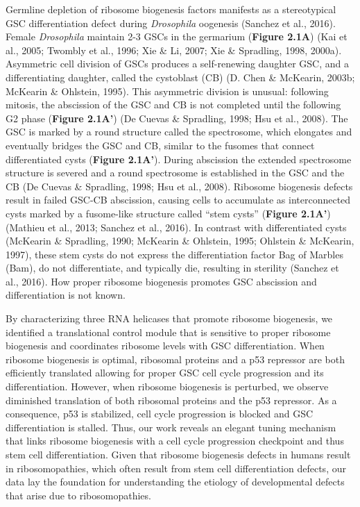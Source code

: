 \documentclass[12pt,oneside]{reedthesis}
\begin{document}
Germline depletion of ribosome biogenesis factors manifests as a
stereotypical GSC differentiation defect during \emph{Drosophila} oogenesis
(Sanchez et al., 2016). Female \emph{Drosophila} maintain 2-3 GSCs in the
germarium (\textbf{Figure 2.1A}) (Kai et al., 2005; Twombly et al., 1996; Xie \& Li, 2007; Xie \& Spradling, 1998, 2000a). Asymmetric cell division of GSCs produces a
self-renewing daughter GSC, and a differentiating daughter, called the
cystoblast (CB) (D. Chen \& McKearin, 2003b; McKearin \& Ohlstein, 1995). This asymmetric
division is unusual: following mitosis, the abscission of the GSC and CB
is not completed until the following G2 phase (\textbf{Figure 2.1A'})
(De Cuevas \& Spradling, 1998; Hsu et al., 2008). The GSC is marked by a
round structure called the spectrosome, which elongates and eventually
bridges the GSC and CB, similar to the fusomes that connect
differentiated cysts (\textbf{Figure 2.1A'}). During abscission the extended
spectrosome structure is severed and a round spectrosome is established
in the GSC and the CB (De Cuevas \& Spradling, 1998; Hsu et al., 2008).
Ribosome biogenesis defects result in failed GSC-CB abscission, causing
cells to accumulate as interconnected cysts marked by a fusome-like
structure called ``stem cysts'' (\textbf{Figure 2.1A'}) (Mathieu et al., 2013; Sanchez et al., 2016). In contrast with differentiated cysts
(McKearin \& Spradling, 1990; McKearin \& Ohlstein, 1995; Ohlstein \& McKearin, 1997), these stem cysts do not
express the differentiation factor Bag of Marbles (Bam), do not
differentiate, and typically die, resulting in sterility
(Sanchez et al., 2016). How proper ribosome biogenesis promotes GSC
abscission and differentiation is not known.

By characterizing three RNA helicases that promote ribosome biogenesis,
we identified a translational control module that is sensitive to proper
ribosome biogenesis and coordinates ribosome levels with GSC
differentiation. When ribosome biogenesis is optimal, ribosomal proteins
and a p53 repressor are both efficiently translated allowing for proper
GSC cell cycle progression and its differentiation. However, when
ribosome biogenesis is perturbed, we observe diminished translation of
both ribosomal proteins and the p53 repressor. As a consequence, p53 is
stabilized, cell cycle progression is blocked and GSC differentiation is
stalled. Thus, our work reveals an elegant tuning mechanism that links
ribosome biogenesis with a cell cycle progression checkpoint and thus
stem cell differentiation. Given that ribosome biogenesis defects in
humans result in ribosomopathies, which often result from stem cell
differentiation defects, our data lay the foundation for understanding
the etiology of developmental defects that arise due to ribosomopathies.
\end{document}
